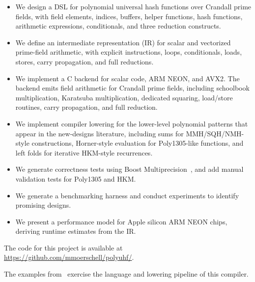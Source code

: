 \begin{itemize}
    \item We design a DSL for polynomial universal hash functions over Crandall prime fields, with field elements, indices, buffers, helper functions, hash functions, arithmetic expressions, conditionals, and three reduction constructs.
    \item We define an intermediate representation (IR) for scalar and vectorized prime-field arithmetic, with explicit instructions, loops, conditionals, loads, stores, carry propagation, and full reductions.
    \item We implement a C backend for scalar code, ARM NEON, and AVX2. The backend emits field arithmetic for Crandall prime fields, including schoolbook multiplication, Karatsuba multiplication, dedicated squaring, load/store routines, carry propagation, and full reduction.
    \item We implement compiler lowering for the lower-level polynomial patterns that appear in the new-designs literature, including sums for MMH/SQH/NMH-style constructions, Horner-style evaluation for Poly1305-like functions, and left folds for iterative HKM-style recurrences.
    \item We generate correctness tests using Boost Multiprecision~\cite{boost}, and add manual validation tests for Poly1305 and HKM.
    \item We generate a benchmarking harness and conduct experiments to identify promising designs.
    \item We present a performance model for Apple silicon ARM NEON chips, deriving runtime estimates from the IR.
\end{itemize}

The code for this project is available at \url{https://github.com/mmoerschell/polyuhf/}.

The examples from~\cite{gilcher2026newdesigns} exercise the language and lowering pipeline of this compiler.
